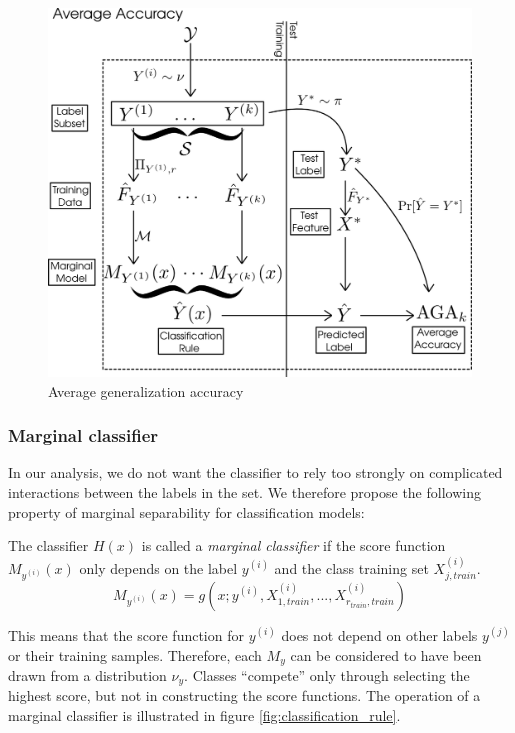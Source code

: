 \documentclass[twoside,11pt]{article}
\begin{document}
\begin{figure}[h]
\centering
\includegraphics[scale = 0.3]{average_risk.png}
\caption{Average generalization accuracy}\label{fig:average_risk}
\end{figure}

\subsubsection{Marginal classifier}

In our analysis, we do not
want the classifier to rely too strongly on complicated interactions
between the labels in the set. We therefore propose the following
property of marginal separability for classification models:

\begin{definition}
The classifier $H(x)$ is called a \emph{marginal classifier} if the score 
function $M_{y^{(i)}}(x)$
only depends on the label $y^{(i)}$ and the class training set $X_{j, train}^{(i)}$.
\[M_{y^{(i)}}(x) = g(x; y^{(i)},X_{1, train}^{(i)},...,X_{r_{train}, train}^{(i)})\]
\end{definition}
This means that the score function for $y^{(i)}$ does not depend on other labels $y^{(j)}$ or their training 
samples.  Therefore, each $M_y$ can be considered to have been drawn from a distribution $\nu_y$.
Classes ``compete'' only through selecting the highest score, 
but not in constructing the score functions. 
The operation of a marginal classifier is illustrated in figure
\ref{fig:classification_rule}.
\end{document}
